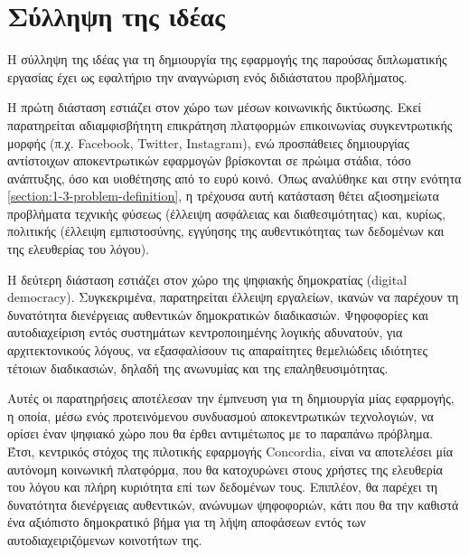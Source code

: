 \section{Σύλληψη της ιδέας} \label{section:3-1-idea-conception}

Η σύλληψη της ιδέας για τη δημιουργία της εφαρμογής της παρούσας διπλωματικής εργασίας έχει ως εφαλτήριο την αναγνώριση ενός διδιάστατου προβλήματος.

Η πρώτη διάσταση εστιάζει στον χώρο των μέσων κοινωνικής δικτύωσης. Εκεί παρατηρείται αδιαμφισβήτητη επικράτηση πλατφορμών επικοινωνίας συγκεντρωτικής μορφής (π.χ. Facebook, Twitter, Instagram), ενώ προσπάθειες δημιουργίας αντίστοιχων αποκεντρωτικών εφαρμογών βρίσκονται σε πρώιμα στάδια, τόσο ανάπτυξης, όσο και υιοθέτησης από το ευρύ κοινό. Όπως αναλύθηκε και στην ενότητα \ref{section:1-3-problem-definition}, η τρέχουσα αυτή κατάσταση θέτει αξιοσημείωτα προβλήματα τεχνικής φύσεως (έλλειψη ασφάλειας και διαθεσιμότητας) και, κυρίως, πολιτικής (έλλειψη εμπιστοσύνης, εγγύησης της αυθεντικότητας των δεδομένων και της ελευθερίας του λόγου).

Η δεύτερη διάσταση εστιάζει στον χώρο της ψηφιακής δημοκρατίας (digital democracy). Συγκεκριμένα, παρατηρείται έλλειψη  εργαλείων, ικανών να παρέχουν τη δυνατότητα διενέργειας αυθεντικών δημοκρατικών διαδικασιών. Ψηφοφορίες και αυτοδιαχείριση εντός συστημάτων κεντροποιημένης λογικής αδυνατούν, για αρχιτεκτονικούς λόγους, να εξασφαλίσουν τις απαραίτητες θεμελιώδεις ιδιότητες τέτοιων διαδικασιών, δηλαδή της ανωνυμίας και της επαληθευσιμότητας.

Αυτές οι παρατηρήσεις αποτέλεσαν την έμπνευση για τη δημιουργία μίας εφαρμογής, η οποία, μέσω ενός προτεινόμενου συνδυασμού αποκεντρωτικών τεχνολογιών, να ορίσει έναν ψηφιακό χώρο που θα έρθει αντιμέτωπος με το παραπάνω πρόβλημα. Έτσι, κεντρικός στόχος της πιλοτικής εφαρμογής Concordia, είναι να αποτελέσει μία αυτόνομη κοινωνική πλατφόρμα, που θα κατοχυρώνει στους χρήστες της ελευθερία του λόγου και πλήρη κυριότητα επί των δεδομένων τους. Επιπλέον, θα παρέχει τη δυνατότητα διενέργειας αυθεντικών, ανώνυμων ψηφοφοριών, κάτι που θα την καθιστά ένα αξιόπιστο δημοκρατικό βήμα για τη λήψη αποφάσεων εντός των αυτοδιαχειριζόμενων κοινοτήτων της.
